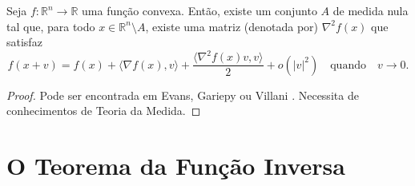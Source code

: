 \begin{teo}
	Seja $f:\mathbb{R}^n \to \mathbb{R}$ uma função convexa. Então, existe um conjunto $A$ de medida nula tal que, para todo $x \in \mathbb{R}^n \setminus A$, existe uma matriz (denotada por) $\nabla^2 f (x)$ que satisfaz
	\[
	f(x + v) = f(x) + \langle \nabla f (x), v \rangle + \frac{\langle \nabla^2 f (x) v, v  \rangle}{2} + o (|v|^2) \quad \text{quando} \quad v \to 0.
	\]
\end{teo}

\begin{proof}
	Pode ser encontrada em Evans, Gariepy \cite{EvGa-92} ou Villani \cite{Vill-09}. Necessita de conhecimentos de Teoria da Medida.
\end{proof}

\section{O Teorema da Função Inversa}

